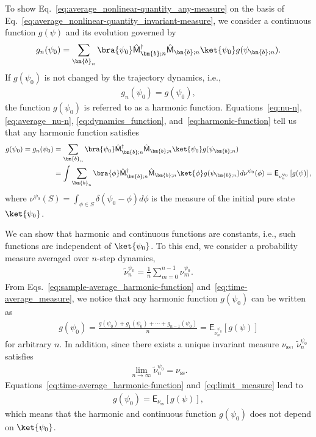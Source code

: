 \documentclass[preprint,pteplogo]{ptephy_v2}%
\numberwithin{equation}{section}
\theoremstyle{definition}
\begin{document}
To show Eq.~\eqref{eq:average_nonlinear-quantity_any-measure} on the basis of Eq.~\eqref{eq:average_nonlinear-quantity_invariant-measure}, we consider a continuous function $g(\psi)$ and its evolution governed by 
\begin{align}
    g_n(\psi_0)=\sum_{\bm{b}_n} \bra{\psi_0}\hat{\mathsf{M}}_{\bm{b};n}^\dagger\hat{\mathsf{M}}_{\bm{b};n}\ket{\psi_0}g(\psi_{\bm{b};n}).
    \label{eq:dynamics_function}
\end{align}
If $g(\psi_0)$ is not changed by the trajectory dynamics, i.e., 
\begin{align}
    g_n(\psi_0)=g(\psi_0),
    \label{eq:harmonic-function}
\end{align}
the function $g(\psi_0)$ is referred to as a harmonic function. 
Equations~\eqref{eq:nu-n}, \eqref{eq:average_nu-n}, \eqref{eq:dynamics_function}, and~\eqref{eq:harmonic-function} tell us that any harmonic function satisfies 
\begin{align}
    g(\psi_0)=g_n(\psi_0)
    &=\sum_{\bm{b}_n}\bra{\psi_0}\hat{\mathsf{M}}_{\bm{b};n}^\dagger \hat{\mathsf{M}}_{\bm{b};n}\ket{\psi_0}g(\psi_{\bm{b};n})\nonumber\\
    &=\int\sum_{\bm{b}_n}\bra{\phi}\hat{\mathsf{M}}_{\bm{b};n}^\dagger \hat{\mathsf{M}}_{\bm{b};n}\ket{\phi}g(\psi_{\bm{b};n}) d\nu^{\psi_0}(\phi)=\mathsf{E}_{\nu_n^{\psi_0}}\left[g(\psi)\right],
    \label{eq:sample-average_harmonic-function}
\end{align}
where $\nu^{\psi_0}(S)=\int_{\phi \in S}\delta(\psi_0-\phi)d\phi$ is the measure of the initial pure state $\ket{\psi_0}$.

We can show that harmonic and continuous functions are constants, i.e., such functions are independent of $\ket{\psi_0}$. 
To this end, we consider a probability measure averaged over $n$-step dynamics,
\begin{align}
    \tilde{\nu}_n^{\psi_0}=\frac{1}{n}\sum_{m=0}^{n-1}\nu_m^{\psi_0}.
    \label{eq:time-average_measure}
\end{align}
From Eqs.~\eqref{eq:sample-average_harmonic-function} and~\eqref{eq:time-average_measure}, we notice that any harmonic function $g(\psi_0)$ can be written as 
\begin{align}
    g(\psi_0)=\frac{g(\psi_0)+g_1(\psi_0)+\cdots +g_{n-1}(\psi_0)}{n}=\mathsf{E}_{\tilde{\nu}_n^{\psi_0}}[g(\psi)]
    \label{eq:time-average_harmonic-function}
\end{align}
for arbitrary $n$. 
In addition, since there exists a unique invariant measure $\nu_\mathrm{ss}$, $\tilde{\nu}_n^{\psi_0}$ satisfies
\begin{align}
    \lim_{n\rightarrow\infty}\tilde{\nu}_n^{\psi_0}=\nu_\mathrm{ss}.
    \label{eq:limit_measure}
\end{align}
Equations~\eqref{eq:time-average_harmonic-function} and~\eqref{eq:limit_measure} lead to
\begin{align}
    g(\psi_0)=\mathsf{E}_{\nu_\mathrm{ss}}[g(\psi)],
    \label{eq:time-average_harmonic-function_invariant-measure}
\end{align}
which means that the harmonic and continuous function $g(\psi_0)$ does not depend on $\ket{\psi_0}$. 
\end{document}

